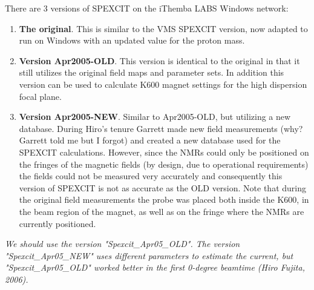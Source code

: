 \documentclass[11pt]{report}
\begin{document}
There are 3 versions of SPEXCIT on the iThemba LABS Windows network:
\begin{enumerate}
\item {\bf The original}. This is similar to the VMS SPEXCIT version, now adapted to run on 
      Windows with an updated value for the proton mass.
\item {\bf Version Apr2005-OLD}. This version is identical to the original in that
      it still utilizes the original field maps and parameter sets.  In addition this version can be
      used to calculate K600 magnet settings for the high dispersion focal plane. 
\item {\bf Version Apr2005-NEW}. Similar to Apr2005-OLD, but utilizing a new database. 
      During Hiro's tenure Garrett made new field measurements (why? Garrett told me but I forgot)
      and created a new database used for the SPEXCIT calculations. However, since 
      the NMRs could only be positioned on the fringes of the magnetic fields 
      (by design, due to operational requirements) the fields could not be measured very accurately and
      consequently this version of SPEXCIT is not as accurate as the OLD version.
      Note that during the original field measurements the probe was placed both inside the K600,
      in the beam region of the magnet, as well as on the fringe where the NMRs are currently positioned.
\end{enumerate}

{\it We should use the version "Spexcit\_Apr05\_OLD". 
The version "Spexcit\_Apr05\_NEW" uses different parameters to estimate the current, 
but "Spexcit\_Apr05\_OLD" worked better in the first 0-degree beamtime (Hiro Fujita, 2006). }
\end{document}
